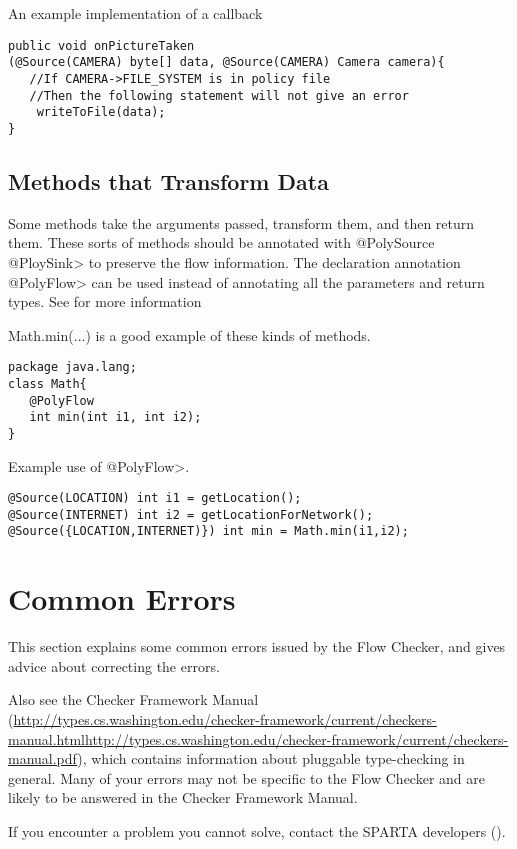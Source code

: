 An example implementation of a callback
\begin{Verbatim}
public void onPictureTaken
(@Source(CAMERA) byte[] data, @Source(CAMERA) Camera camera){
   //If CAMERA->FILE_SYSTEM is in policy file
   //Then the following statement will not give an error
    writeToFile(data);
}
\end{Verbatim}


\subsection{Methods that Transform Data}

Some methods take the arguments passed, transform them, and then return them.  These sorts of 
methods should be annotated with \<@PolySource @PloySink>
  to preserve the flow information.  The declaration annotation \<@PolyFlow> can be used instead of
  annotating all the parameters and return types. See  for more information 
  
  Math.min(...) is a good example of these kinds of methods. 
  
  \begin{Verbatim}
package java.lang;
class Math{
   @PolyFlow  
   int min(int i1, int i2);
}
\end{Verbatim}

Example use of \<@PolyFlow>.
\begin{Verbatim}
@Source(LOCATION) int i1 = getLocation();
@Source(INTERNET) int i2 = getLocationForNetwork();
@Source({LOCATION,INTERNET)}) int min = Math.min(i1,i2);
 \end{Verbatim}

\section{Common Errors\label{errors}}

This section explains some common errors issued by the Flow Checker, and
gives advice about correcting the errors.   

Also see the Checker Framework Manual
(\ifhevea\url{http://types.cs.washington.edu/checker-framework/current/checkers-manual.html}\else\url{http://types.cs.washington.edu/checker-framework/current/checkers-manual.pdf}\fi),
which contains information about pluggable type-checking in general.  Many
of your errors may not be specific to the Flow Checker and are likely to be
answered in the Checker Framework Manual.

If you encounter a problem you cannot solve, contact the SPARTA developers ().



